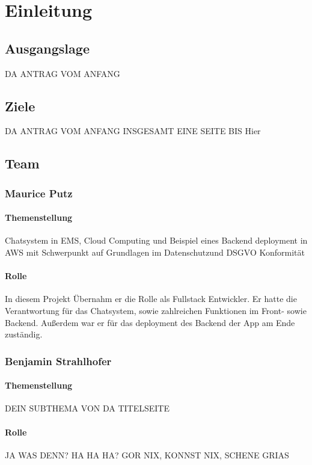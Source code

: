\chapter{Einleitung}


\section{Ausgangslage}
DA ANTRAG VOM ANFANG

\section{Ziele}
DA ANTRAG VOM ANFANG
INSGESAMT EINE SEITE BIS Hier

\newpage
\section{Team}

\subsection{Maurice Putz}
\subsubsection{Themenstellung}
Chatsystem in EMS, Cloud Computing und Beispiel eines Backend deployment in AWS mit Schwerpunkt auf Grundlagen im Datenschutzund DSGVO Konformität
\subsubsection{Rolle}
In diesem Projekt Übernahm er die Rolle als Fullstack Entwickler. Er hatte die Verantwortung für das Chatsystem,
sowie zahlreichen Funktionen im Front- sowie Backend. Außerdem war er für das deployment des Backend der App am Ende zuständig.

\subsection{Benjamin Strahlhofer}
\subsubsection{Themenstellung}
DEIN SUBTHEMA VON DA TITELSEITE
\subsubsection{Rolle}
JA WAS DENN? HA HA HA? GOR NIX, KONNST NIX, SCHENE GRIAS


